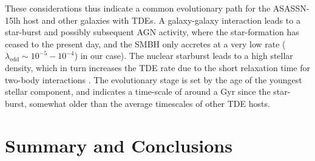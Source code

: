 \documentclass[traditabstract]{aa}
\begin{document}
These considerations thus indicate a common evolutionary path for the ASASSN-15lh host and other galaxies with TDEs. A galaxy-galaxy interaction leads to a star-burst and possibly subsequent AGN activity, where the star-formation has ceased to the present day, and the SMBH only accretes at a very low rate ($\lambda_{\mathrm{edd}}\sim10^{-5}-10^{-4}$) in our case). The nuclear starburst leads to a high stellar density, which in turn increases the TDE rate due to the short relaxation time for two-body interactions \citep{2016MNRAS.461..948M, 2016ApJ...825L..14S, 2017arXiv170702986G}. The evolutionary stage is set by the age of the youngest stellar component, and indicates a time-scale of around a Gyr since the star-burst, somewhat older than the average timescales of other TDE hosts. %

\section{Summary and Conclusions}
\end{document}
